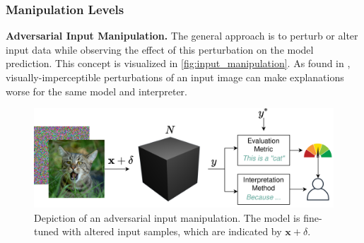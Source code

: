 \documentclass[sigconf]{acmart}
\begin{document}
\subsubsection{Manipulation Levels}
\label{subsubsec:manipulation_levels}
\par\smallskip
\noindent 

\par\smallskip
\noindent\textbf{Adversarial Input Manipulation.} The general approach is to perturb or alter input data while observing the effect of this perturbation on the model prediction. This concept is visualized in \autoref{fig:input_manipulation}. 
As found in \cite{dombrowski2019explanations}, visually-imperceptible perturbations of an input image can make explanations worse for the same model and interpreter. 

\begin{figure}[ht]
    \centering
    \includegraphics[width=\linewidth]{figures/input_manipulations.png}
    \caption{Depiction of an adversarial input manipulation. The model is fine-tuned with altered input samples, which are indicated by $\mathbf{x}+\delta$.}
    \label{fig:input_manipulation}
    \vspace{-0.3cm}
\end{figure}
\end{document}
